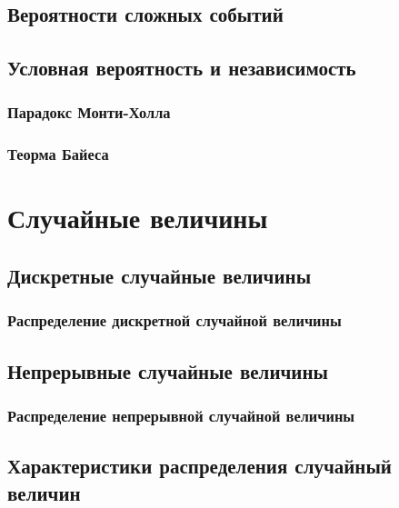 \documentclass[
  letterpaper,
]{scrbook}
\theoremstyle{definition}
\theoremstyle{remark}
\begin{document}
\section{Вероятности сложных событий}\label{stats-rand-exp-prob-complex}

\section{Условная вероятность и
независимость}\label{stats-rand-exp-prob-cond}

\subsection{Парадокс Монти-Холла}\label{stats-rand-exp-prob-monty}

\subsection{Теорма Байеса}\label{stats-rand-exp-bayes}


\chapter{Случайные величины}\label{stats-rand-values}

\section{Дискретные случайные
величины}\label{stats-rand-values-discrete}

\subsection{Распределение дискретной случайной
величины}\label{stats-rand-values-discrete-distribution}

\section{Непрерывные случайные
величины}\label{stats-rand-values-continuous}

\subsection{Распределение непрерывной случайной
величины}\label{stats-rand-values-continuous-distribution}

\section{Характеристики распределения случайный
величин}\label{stats-rand-values-moments}
\end{document}
